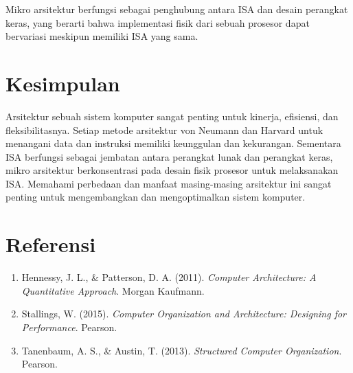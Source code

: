 \documentclass{article}
\begin{document}
Mikro arsitektur berfungsi sebagai penghubung antara ISA dan desain perangkat keras, yang berarti bahwa implementasi fisik dari sebuah prosesor dapat bervariasi meskipun memiliki ISA yang sama.

\section{Kesimpulan}

Arsitektur sebuah sistem komputer sangat penting untuk kinerja, efisiensi, dan fleksibilitasnya. Setiap metode arsitektur von Neumann dan Harvard untuk menangani data dan instruksi memiliki keunggulan dan kekurangan. Sementara ISA berfungsi sebagai jembatan antara perangkat lunak dan perangkat keras, mikro arsitektur berkonsentrasi pada desain fisik prosesor untuk melaksanakan ISA. Memahami perbedaan dan manfaat masing-masing arsitektur ini sangat penting untuk mengembangkan dan mengoptimalkan sistem komputer.

\section{Referensi}

\begin{enumerate}
  \item Hennessy, J. L., \& Patterson, D. A. (2011). \textit{Computer Architecture: A Quantitative Approach}. Morgan Kaufmann.
  \item Stallings, W. (2015). \textit{Computer Organization and Architecture: Designing for Performance}. Pearson.
  \item Tanenbaum, A. S., \& Austin, T. (2013). \textit{Structured Computer Organization}. Pearson.
\end{enumerate}
\end{document}
